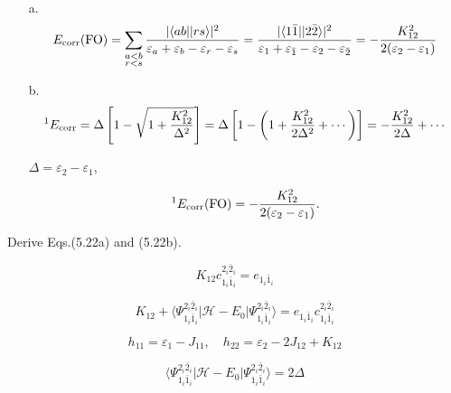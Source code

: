 \documentclass[a4paper]{book}
\newcommand{\corr}{{\rm corr}}
\begin{document}
	\begin{solution}
	
	\begin{enumerate}
	
	\item[a.] 
	\begin{equation}
		E_\corr ({\rm FO}) = \sum_{ \substack{ a<b \\ r<s } } \frac{ | \langle ab || rs \rangle |^2 }{ \varepsilon_a + \varepsilon_b - \varepsilon_r - \varepsilon_s } = \frac{ | \langle 1 \bar{1} || 2 \bar{2} \rangle |^2 }{ \varepsilon_1 + \varepsilon_{\bar{1}} - \varepsilon_2 - \varepsilon_{\bar{2}} } = - \frac{ K^2_{12} }{ 2( \varepsilon_2 - \varepsilon_1 ) }
	\end{equation}
		
	\item[b.]
	\[
		{}^1 E_\corr = \Delta \left[ 1 - \sqrt{ 1 + \frac{ K^2_{12} }{ \Delta^2 } } \right] = \Delta \left[ 1 - \left( 1 + \frac{ K^2_{12} }{ 2\Delta^2 } + \cdots \right) \right] = - \frac{ K^2_{12} }{ 2\Delta } + \cdots
	\]
	
	$\Delta = \varepsilon_2 - \varepsilon_1$,
	
	\begin{equation}
		{}^1 E_\corr ({\rm FO}) = - \frac{ K^2_{12} }{ 2( \varepsilon_2 - \varepsilon_1 ) }.
	\end{equation}
	
	\end{enumerate}		
	
	\end{solution}
	
	\begin{exercise}
	Derive Eqs.(5.22a) and (5.22b).
	\end{exercise}
	
	\begin{solution}
	
	\[
		K_{12} c^{2_i \bar{2}_i}_{1_i \bar{1}_i} = e_{1_i \bar{1}_i }
	\]
	
	\[
		K_{12} + \langle \Psi^{2_i \bar{2}_i}_{1_i \bar{1}_i} | \mathscr{H} - E_0 | \Psi^{2_i \bar{2}_i}_{1_i \bar{1}_i} \rangle = e_{ 1_i \bar{1}_i } c^{2_i \bar{2}_i}_{1_i \bar{1}_i}
	\]
	
	\[
		h_{11} = \varepsilon_1 - J_{11} , \quad h_{22} = \varepsilon_2 - 2 J_{12} + K_{12}
	\]
	
	\[
		\langle \Psi^{2_i \bar{2}_i}_{1_i \bar{1}_i} | \mathscr{H} - E_0 | \Psi^{2_i \bar{2}_i}_{1_i \bar{1}_i} \rangle = 2 \Delta
	\]
	
	\end{solution}
	
\end{document}
